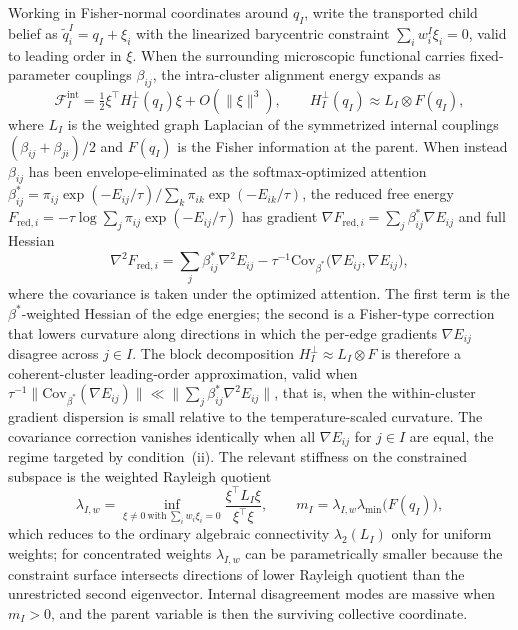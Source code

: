 \documentclass[11pt]{article}
\begin{document}
Working in Fisher-normal coordinates around $q_I$, write the transported child belief as $\widetilde{q}_i^I = q_I + \xi_i$ with the linearized barycentric constraint $\sum_i w_i^I \xi_i = 0$, valid to leading order in $\xi$. When the surrounding microscopic functional carries fixed-parameter couplings $\beta_{ij}$, the intra-cluster alignment energy expands as
\begin{equation}
\mathcal{F}_I^{\mathrm{int}} = \tfrac{1}{2}\xi^\top H_I^\perp(q_I)\xi + O(\|\xi\|^3), \qquad H_I^\perp(q_I) \approx L_I \otimes F(q_I),
\label{eq:rg_internal_hessian}
\end{equation}
where $L_I$ is the weighted graph Laplacian of the symmetrized internal couplings $(\beta_{ij} + \beta_{ji})/2$ and $F(q_I)$ is the Fisher information at the parent. When instead $\beta_{ij}$ has been envelope-eliminated as the softmax-optimized attention $\beta^*_{ij} = \pi_{ij} \exp(-E_{ij}/\tau) / \sum_k \pi_{ik} \exp(-E_{ik}/\tau)$, the reduced free energy $F_{\mathrm{red},i} = -\tau \log \sum_j \pi_{ij} \exp(-E_{ij}/\tau)$ has gradient $\nabla F_{\mathrm{red},i} = \sum_j \beta^*_{ij} \nabla E_{ij}$ and full Hessian
\begin{equation}
\nabla^2 F_{\mathrm{red},i} = \sum_j \beta^*_{ij} \nabla^2 E_{ij} - \tau^{-1} \mathrm{Cov}_{\beta^*}\big(\nabla E_{ij}, \nabla E_{ij}\big),
\label{eq:rg_reduced_hessian}
\end{equation}
where the covariance is taken under the optimized attention. The first term is the $\beta^*$-weighted Hessian of the edge energies; the second is a Fisher-type correction that lowers curvature along directions in which the per-edge gradients $\nabla E_{ij}$ disagree across $j \in I$. The block decomposition $H_I^\perp \approx L_I \otimes F$ is therefore a coherent-cluster leading-order approximation, valid when $\tau^{-1}\|\mathrm{Cov}_{\beta^*}(\nabla E_{ij})\| \ll \|\sum_j \beta^*_{ij} \nabla^2 E_{ij}\|$, that is, when the within-cluster gradient dispersion is small relative to the temperature-scaled curvature. The covariance correction vanishes identically when all $\nabla E_{ij}$ for $j \in I$ are equal, the regime targeted by condition~(ii). The relevant stiffness on the constrained subspace is the weighted Rayleigh quotient
\begin{equation}
\lambda_{I,w} = \inf_{\xi \neq 0\ \text{with}\ \sum_i w_i \xi_i = 0} \frac{\xi^\top L_I \xi}{\xi^\top \xi}, \qquad m_I = \lambda_{I,w}\lambda_{\min}\big(F(q_I)\big),
\label{eq:rg_constrained_gap}
\end{equation}
which reduces to the ordinary algebraic connectivity $\lambda_2(L_I)$ only for uniform weights; for concentrated weights $\lambda_{I,w}$ can be parametrically smaller because the constraint surface intersects directions of lower Rayleigh quotient than the unrestricted second eigenvector. Internal disagreement modes are massive when $m_I > 0$, and the parent variable is then the surviving collective coordinate.
\end{document}
